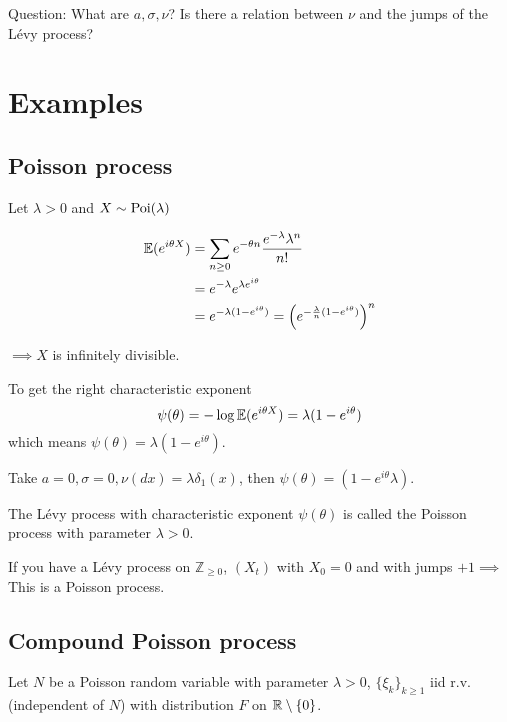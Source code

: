 
Question: What are $a,\sigma,\nu$? Is there a relation between $\nu$ and the jumps of the Lévy process?

\section{Examples}

\subsection{Poisson process}

Let $\lambda>0$ and $X\sim\text{Poi}(\lambda)$

\begin{align*}
    \mathbb{E}(e^{i\theta X})&=\sum_{n\geq 0}e^{-\theta n}\frac{e^{-\lambda}\lambda^n}{n!}\\
    &=e^{-\lambda}e^{\lambda e^{i\theta}}\\
    &=e^{-\lambda(1-e^{i\theta})}=\left(e^{-\frac{\lambda}{n}(1-e^{i\theta})}\right)^n
\end{align*}

$\implies X$ is infinitely divisible.

To get the right characteristic exponent \[\psi(\theta)=-\log\mathbb{E}(e^{i\theta X})=\lambda(1-e^{i\theta})\]
which means $\psi(  \theta)=\lambda(1-e^{i\theta})$.

Take $a=0,\sigma=0,\nu(dx)=\lambda\delta_1(x)$, then $\psi(\theta)=(1-e^{i\theta}\lambda)$.

The Lévy process with characteristic exponent $\psi(\theta)$ is called the Poisson process with parameter $\lambda>0$.

\begin{aremark}
    If you have a Lévy process on $\mathbb{Z}_{\geq 0}$, $(X_t)$ with $X_0=0$ and 
    with jumps $+1\implies$ This is a Poisson process.
\end{aremark}

\subsection{Compound Poisson process}

Let $N$ be a Poisson random variable with parameter $\lambda>0$, $\{\xi_k\}_{k\geq 1}$ iid r.v. (independent of $N$)
with distribution $F$ on $\mathbb{R}\setminus\{0\}$.

